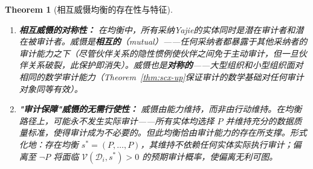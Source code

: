 \documentclass[12pt,a4paper]{ctexart}
\newtheorem{theorem}{Theorem}[section]
\theoremstyle{definition}
\theoremstyle{remark}
\begin{document}
\begin{theorem}[相互威慑均衡的存在性与特征]
\begin{enumerate}[label=(\roman*), itemsep=6pt]
\item \textbf{相互威慑的对称性：} 在均衡中，\textit{所有}采纳Yajie的实体同时是潜在审计者和潜在被审计者。威慑是\textbf{相互的}（mutual）——任何采纳者都暴露于其他采纳者的审计能力之下（尽管伙伴关系的隐性惯例使伙伴之间免于主动审计，但一旦伙伴关系破裂，此保护即消失）。威慑也是\textbf{对称的}——大型组织和小型组织面对相同的数学审计能力（Theorem~\ref{thm:scx-up}保证审计的数学基础对任何审计对象同等有效）。

\item \textbf{"审计保障"威慑的无需行使性：} 威慑由\textit{能力}维持，而非由\textit{行动}维持。在均衡路径上，可能\textit{永不}发生实际审计——所有实体均选择 $P$ 并维持充分的数据质量标准，使得审计成为不必要的。但此均衡恰由审计能力的存在所支撑。形式化地：存在均衡 $s^* = (P, \ldots, P)$，其维持不依赖任何实体实际执行审计；偏离至 $\neg P$ 将面临 $\mathcal{V}(\mathcal{D}_i, s^*) > 0$ 的预期审计概率，使偏离无利可图。
\end{enumerate}
\end{theorem}
\end{document}
